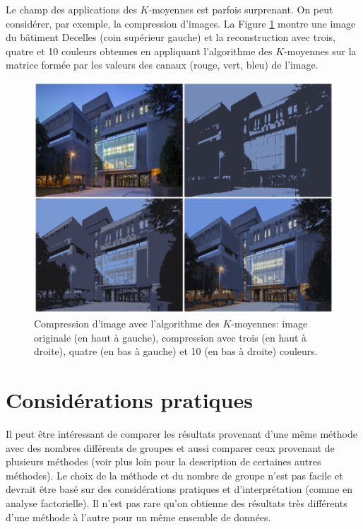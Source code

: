 \documentclass[
  11pt,
  letterpaper,
]{book}
\theoremstyle{definition}
\theoremstyle{definition}
\theoremstyle{definition}
\theoremstyle{remark}
\begin{document}
Le champ des applications des \(K\)-moyennes est parfois surprenant. On peut considérer, par exemple, la compression d'images. La Figure \ref{fig:decelles} montre une image du bâtiment Decelles (coin supérieur gauche) et la reconstruction avec trois, quatre et 10 couleurs obtenues en appliquant l'algorithme des \(K\)-moyennes sur la matrice formée par les valeurs des canaux (rouge, vert, bleu) de l'image.

\begin{figure}

{\centering \includegraphics[width=0.8\linewidth]{figures/kmoyennes_decelles} 

}

\caption{Compression d'image avec l'algorithme des $K$-moyennes: image originale (en haut à gauche), compression avec trois (en haut à droite), quatre (en bas à gauche) et 10 (en bas à droite) couleurs.}\label{fig:decelles}
\end{figure}

\hypertarget{considuxe9rations-pratiques}{%
\section{Considérations pratiques}\label{considuxe9rations-pratiques}}

Il peut être intéressant de comparer les résultats provenant d'une même méthode avec des nombres différents de groupes et aussi comparer ceux provenant de plusieurs méthodes (voir plus loin pour la description de certaines autres méthodes). Le choix de la méthode et du nombre de groupe n'est pas facile et devrait être basé sur des considérations pratiques et d'interprétation (comme en analyse factorielle). Il n'est pas rare qu'on obtienne des résultats très différents d'une méthode à l'autre pour un même ensemble de données.
\end{document}
